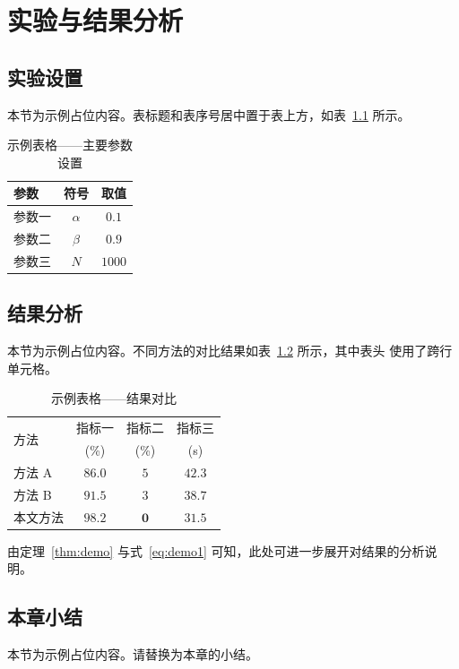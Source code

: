 \chapter{实验与结果分析}\label{chap:experiment}

\section{实验设置}
本节为示例占位内容。表标题和表序号居中置于表上方，如表~\ref{tab:params} 所示。

\begin{table}[htbp]
  \centering
  \caption{示例表格——主要参数设置}
  \label{tab:params}
  \begin{tabular}{lcc}
    \toprule
    参数 & 符号 & 取值 \\
    \midrule
    参数一 & $\alpha$ & $0.1$ \\
    参数二 & $\beta$  & $0.9$ \\
    参数三 & $N$      & $1000$ \\
    \bottomrule
  \end{tabular}
\end{table}

\section{结果分析}
本节为示例占位内容。不同方法的对比结果如表~\ref{tab:results} 所示，其中表头
使用了跨行单元格。

\begin{table}[htbp]
  \centering
  \caption{示例表格——结果对比}
  \label{tab:results}
  \begin{tabular}{lccc}
    \toprule
    \multirow{2}{*}{方法} & 指标一 & 指标二 & 指标三 \\
                          & (\%)   & (\%)   & (s)    \\
    \midrule
    方法 A     & $86.0$ & $5$ & $42.3$ \\
    方法 B     & $91.5$ & $3$ & $38.7$ \\
    本文方法   & $\mathbf{98.2}$ & $\mathbf{0}$ & $\mathbf{31.5}$ \\
    \bottomrule
  \end{tabular}
\end{table}

由定理~\ref{thm:demo} 与式~\eqref{eq:demo1} 可知，此处可进一步展开对结果的分析说明。

\section{本章小结}
本节为示例占位内容。请替换为本章的小结。
